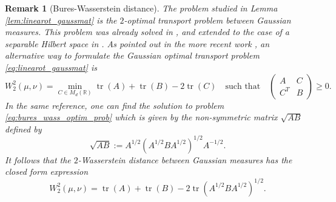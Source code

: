 \documentclass[]{article}
\DeclareMathOperator{\tr}{tr}
\numberwithin{equation}{section}
\theoremstyle{plain}
\newtheorem{rem}{Remark}[section]
\begin{document}
\begin{rem}[Bures-Wasserstein distance]\label{rem:bures_wass}
	The problem studied in Lemma \ref{lem:linearot_gaussmat} is the $2$-optimal transport problem between Gaussian measures. This problem was already solved in \cite{givens1984class}, and extended to the case of a separable Hilbert space in \cite{cuesta1996lower}. As pointed out in the more recent work \cite{bhatia2019bures}, an alternative way to formulate the Gaussian optimal transport problem \eqref{eq:linearot_gaussmat} is 
	\begin{equation}\label{eq:bures_wass_optim_prob}
		W_2^2(\mu, \nu) = \min_{C \in M_d(\mathbb{R})} \tr(A) + \tr(B) - 2 \tr(C) \quad \text{such that} \quad \begin{pmatrix}
			A & C \\
			C^T & B
		\end{pmatrix} \geq 0.
	\end{equation}
	In the same reference, one can find the solution to problem \eqref{eq:bures_wass_optim_prob} which is given by the non-symmetric matrix $\sqrt{AB}$ defined by
	\begin{equation}\label{eq:square_root_product}
		\sqrt{AB} := A^{1/2}\left( A^{1/2}B A^{1/2} \right)^{1/2} A^{-1/2}.
	\end{equation}
	It follows that the $2$-Wasserstein distance between Gaussian measures has the closed form expression
	\begin{equation}\label{eq:solution_bures_wass}
		W_2^2(\mu, \nu) = \tr(A) + \tr(B) - 2 \tr\left( A^{1/2}B A^{1/2} \right)^{1/2}.
	\end{equation}
\end{rem}
\end{document}
